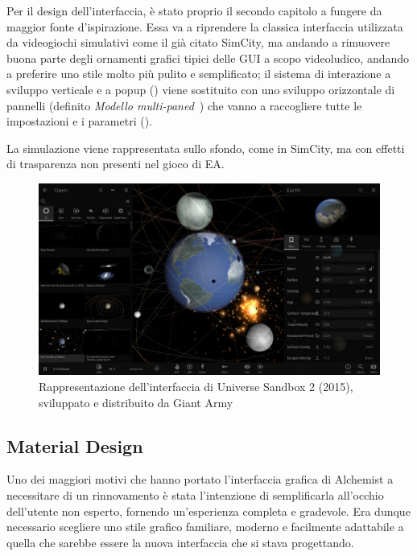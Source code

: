                 Per il design dell'interfaccia, è stato proprio il secondo capitolo a fungere da maggior fonte d'ispirazione.
                Essa va a riprendere la classica interfaccia utilizzata da videogiochi simulativi come il già citato SimCity, ma andando a rimuovere buona parte degli ornamenti grafici tipici delle GUI a scopo videoludico, andando a preferire uno stile molto più pulito e semplificato;
                il sistema di interazione a sviluppo verticale e a popup () viene sostituito con uno sviluppo orizzontale di pannelli (definito \emph{Modello multi-paned}~\cite{multipanedmodel}) che vanno a raccogliere tutte le impostazioni e i parametri ().

                La simulazione viene rappresentata sullo sfondo, come in SimCity, ma con effetti di trasparenza non presenti nel gioco di EA.

                \begin{figure}[htbp]
                    \centering
                    \includegraphics[scale=0.32]{img/universesandboxpanels}
                    \caption{Rappresentazione dell'interfaccia di Universe Sandbox 2 (2015), sviluppato e distribuito da Giant Army}
                    \label{fig:universesandboxpanels}
                \end{figure}

        \subsection{Material Design}\label{subsec:material}
            Uno dei maggiori motivi che hanno portato l'interfaccia grafica di Alchemist a necessitare di un rinnovamento è stata l'intenzione di semplificarla all'occhio dell'utente non esperto, fornendo un'esperienza completa e gradevole.
            Era dunque necessario scegliere uno stile grafico familiare, moderno e facilmente adattabile a quella che sarebbe essere la nuova interfaccia che si stava progettando.

